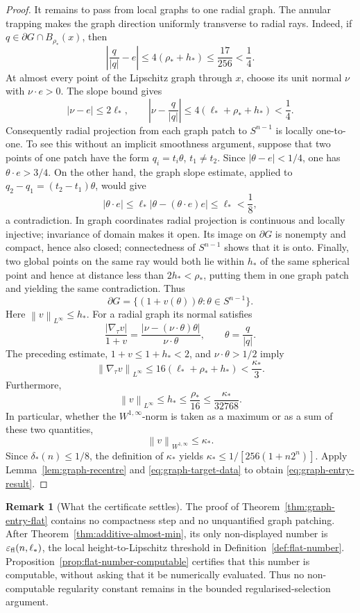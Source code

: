 \documentclass[11pt]{amsart}
\theoremstyle{definition}
\newtheorem{remark}[theorem]{Remark}
\newcommand{\norm}[1]{\left\|#1\right\|}
\begin{document}
\begin{proof}
It remains to pass from local graphs to one radial graph.  The annular
trapping makes the graph direction uniformly transverse to radial rays.
Indeed, if \(q\in\partial G\cap B_{\rho_*}(x)\), then
\[
   \left|\frac{q}{|q|}-e\right|
      \le4(\rho_*+h_*)
      \le\frac{17}{256}<\frac14.
\]
At almost every point of the Lipschitz graph through \(x\), choose its
unit normal \(\nu\) with \(\nu\cdot e>0\).  The slope bound gives
\[
   |\nu-e|\le2\ell_*,
   \qquad
   \left|\nu-\frac{q}{|q|}\right|
      \le4(\ell_*+\rho_*+h_*)<\frac14.
\]
Consequently radial projection from each graph patch to \(S^{n-1}\)
is locally one-to-one.  To see this without an implicit smoothness
argument, suppose that two points of one patch have the form
\(q_i=t_i\theta\), \(t_1\ne t_2\).  Since
\(|\theta-e|<1/4\), one has \(\theta\cdot e>3/4\).  On the other hand,
the graph slope estimate, applied to \(q_2-q_1=(t_2-t_1)\theta\),
would give
\[
   |\theta\cdot e|
      \le \ell_*|\theta-(\theta\cdot e)e|
      \le\ell_*<\frac18,
\]
a contradiction.  In graph coordinates radial projection is
continuous and locally injective; invariance of domain makes it open.
Its image on \(\partial G\) is nonempty and compact, hence also closed;
connectedness of \(S^{n-1}\) shows that it is onto.  Finally, two
global points on the same ray would both lie within \(h_*\) of the
same spherical point and hence at distance less than
\(2h_*<\rho_*\), putting them in one graph patch and yielding the same
contradiction.  Thus
\[
   \partial G=\{(1+v(\theta))\theta:\theta\in S^{n-1}\}.
\]
Here \(\norm{v}_{L^\infty}\le h_*\).  For a radial graph its normal
satisfies
\[
   \frac{|\nabla_\tau v|}{1+v}
      =\frac{|\nu-(\nu\cdot\theta)\theta|}
             {\nu\cdot\theta},
   \qquad \theta=\frac{q}{|q|}.
\]
The preceding estimate, \(1+v\le1+h_*<2\), and
\(\nu\cdot\theta>1/2\) imply
\[
   \norm{\nabla_\tau v}_{L^\infty}
      \le16(\ell_*+\rho_*+h_*)
      <\frac{\kappa_*}{3}.
\]
Furthermore,
\[
   \norm{v}_{L^\infty}
      \le h_*\le\frac{\rho_*}{16}
      \le\frac{\kappa_*}{32768}.
\]
In particular, whether the \(W^{1,\infty}\)-norm is taken as a maximum
or as a sum of these two quantities,
\[
   \norm{v}_{W^{1,\infty}}\le\kappa_*.
\tag{4.95}\label{eq:pre-recentre-graph}
\]
Since \(\delta_*(n)\le1/8\), the definition of \(\kappa_*\) yields
\(\kappa_*\le1/[256(1+n2^n)]\).  Apply
Lemma~\ref{lem:graph-recentre} and
\eqref{eq:graph-target-data} to obtain
\eqref{eq:graph-entry-result}.
\end{proof}

\begin{remark}[What the certificate settles]\label{rem:exact-flat-remaining}
The proof of Theorem~\ref{thm:graph-entry-flat} contains no compactness
step and no unquantified graph patching.  After
Theorem~\ref{thm:additive-almost-min}, its only non-displayed number is
\(\varepsilon_{\rm fl}(n,\ell_*)\), the local height-to-Lipschitz
threshold in Definition~\ref{def:flat-number}.
Proposition~\ref{prop:flat-number-computable} certifies that this number is
computable, without asking that it be numerically evaluated.  Thus no
non-computable regularity constant remains in the bounded
regularised-selection argument.
\end{remark}
\end{document}
